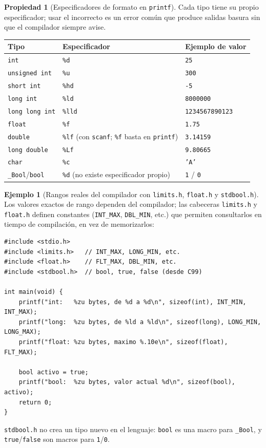 \documentclass[11pt,letterpaper]{article}
\theoremstyle{definition}
\newtheorem{ejemplo}[definicion]{Ejemplo}
\newtheorem{propiedad}[definicion]{Propiedad}
\begin{document}
\begin{propiedad}[Especificadores de formato en \texttt{printf}]
Cada tipo tiene su propio especificador; usar el incorrecto es un error común que produce salidas
basura sin que el compilador siempre avise.
\begin{center}
\begin{tabular}{|l|l|l|}
\hline
\textbf{Tipo} & \textbf{Especificador} & \textbf{Ejemplo de valor} \\ \hline
\texttt{int} & \texttt{\%d} & \texttt{25} \\ \hline
\texttt{unsigned int} & \texttt{\%u} & \texttt{300} \\ \hline
\texttt{short int} & \texttt{\%hd} & \texttt{-5} \\ \hline
\texttt{long int} & \texttt{\%ld} & \texttt{8000000} \\ \hline
\texttt{long long int} & \texttt{\%lld} & \texttt{1234567890123} \\ \hline
\texttt{float} & \texttt{\%f} & \texttt{1.75} \\ \hline
\texttt{double} & \texttt{\%lf} (con \texttt{scanf}; \texttt{\%f} basta en \texttt{printf}) & \texttt{3.14159} \\ \hline
\texttt{long double} & \texttt{\%Lf} & \texttt{9.80665} \\ \hline
\texttt{char} & \texttt{\%c} & \texttt{'A'} \\ \hline
\texttt{\_Bool}/\texttt{bool} & \texttt{\%d} (no existe especificador propio) & \texttt{1} / \texttt{0} \\ \hline
\end{tabular}
\end{center}
\end{propiedad}

\begin{ejemplo}[Rangos reales del compilador con \texttt{limits.h}, \texttt{float.h} y \texttt{stdbool.h}]
Los valores exactos de rango dependen del compilador; las cabeceras \texttt{limits.h} y
\texttt{float.h} definen constantes (\texttt{INT\_MAX}, \texttt{DBL\_MIN}, etc.) que permiten
consultarlos en tiempo de compilación, en vez de memorizarlos:
\begin{lstlisting}
#include <stdio.h>
#include <limits.h>   // INT_MAX, LONG_MIN, etc.
#include <float.h>    // FLT_MAX, DBL_MIN, etc.
#include <stdbool.h>  // bool, true, false (desde C99)

int main(void) {
    printf("int:   %zu bytes, de %d a %d\n", sizeof(int), INT_MIN, INT_MAX);
    printf("long:  %zu bytes, de %ld a %ld\n", sizeof(long), LONG_MIN, LONG_MAX);
    printf("float: %zu bytes, maximo %.10e\n", sizeof(float), FLT_MAX);

    bool activo = true;
    printf("bool:  %zu bytes, valor actual %d\n", sizeof(bool), activo);
    return 0;
}
\end{lstlisting}
\texttt{stdbool.h} no crea un tipo nuevo en el lenguaje: \texttt{bool} es una macro para
\texttt{\_Bool}, y \texttt{true}/\texttt{false} son macros para \texttt{1}/\texttt{0}.
\end{ejemplo}
\end{document}
